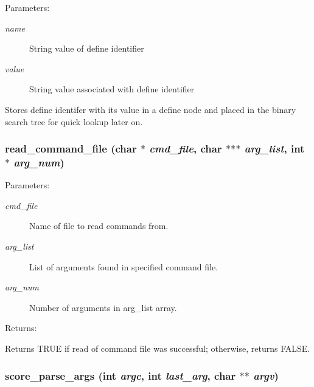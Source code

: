 \begin{Desc}
\item[Parameters: ]\par
\begin{description}
\item[{\em 
name}]String value of define identifier \item[{\em 
value}]String value associated with define identifier\end{description}
\end{Desc}
Stores define identifer with its value in a define node and placed in the binary search tree for quick lookup later on. 
\subsubsection{ read\_\-command\_\-file (char $\ast$ {\em cmd\_\-file}, char $\ast$$\ast$$\ast$ {\em arg\_\-list}, int $\ast$ {\em arg\_\-num})}\label{score_8c_a9}


\begin{Desc}
\item[Parameters: ]\par
\begin{description}
\item[{\em 
cmd\_\-file}]Name of file to read commands from. \item[{\em 
arg\_\-list}]List of arguments found in specified command file. \item[{\em 
arg\_\-num}]Number of arguments in arg\_\-list array. \end{description}
\end{Desc}
\begin{Desc}
\item[Returns: ]\par
Returns TRUE if read of command file was successful; otherwise, returns FALSE. \end{Desc}
\subsubsection{ score\_\-parse\_\-args (int {\em argc}, int {\em last\_\-arg}, char $\ast$$\ast$ {\em argv})}\label{score_8c_a10}


